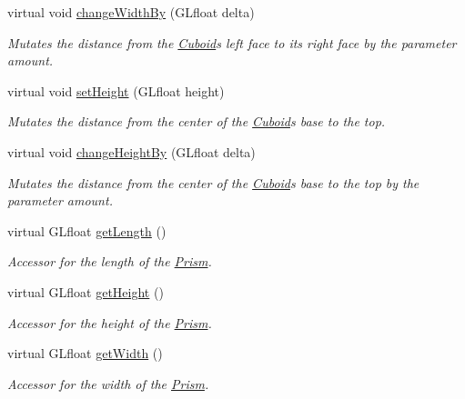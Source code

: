 \begin{DoxyCompactItemize}
virtual void \hyperlink{classtsgl_1_1_cuboid_a72470bd9e57eb12440883ff69b5a9bc4}{change\+Width\+By} (G\+Lfloat delta)
\begin{DoxyCompactList}\small\item\em Mutates the distance from the \hyperlink{classtsgl_1_1_cuboid}{Cuboid}\textquotesingle{}s left face to its right face by the parameter amount. \end{DoxyCompactList}\item 
virtual void \hyperlink{classtsgl_1_1_cuboid_a662cfb3fdb5afb9dff0b7efe517c8641}{set\+Height} (G\+Lfloat height)
\begin{DoxyCompactList}\small\item\em Mutates the distance from the center of the \hyperlink{classtsgl_1_1_cuboid}{Cuboid}\textquotesingle{}s base to the top. \end{DoxyCompactList}\item 
virtual void \hyperlink{classtsgl_1_1_cuboid_af3c9270b597b8e2ff2d16929c81c3db3}{change\+Height\+By} (G\+Lfloat delta)
\begin{DoxyCompactList}\small\item\em Mutates the distance from the center of the \hyperlink{classtsgl_1_1_cuboid}{Cuboid}\textquotesingle{}s base to the top by the parameter amount. \end{DoxyCompactList}\item 
virtual G\+Lfloat \hyperlink{classtsgl_1_1_cuboid_ae7780009759998eb7763d9f885e8e2b8}{get\+Length} ()
\begin{DoxyCompactList}\small\item\em Accessor for the length of the \hyperlink{classtsgl_1_1_prism}{Prism}. \end{DoxyCompactList}\item 
virtual G\+Lfloat \hyperlink{classtsgl_1_1_cuboid_a4703e0321f31b4757673c8faf7b2b8df}{get\+Height} ()
\begin{DoxyCompactList}\small\item\em Accessor for the height of the \hyperlink{classtsgl_1_1_prism}{Prism}. \end{DoxyCompactList}\item 
virtual G\+Lfloat \hyperlink{classtsgl_1_1_cuboid_a6f5084919851fa715c931b8382a34d6c}{get\+Width} ()
\begin{DoxyCompactList}\small\item\em Accessor for the width of the \hyperlink{classtsgl_1_1_prism}{Prism}. \end{DoxyCompactList}\item 

\end{DoxyCompactItemize}
